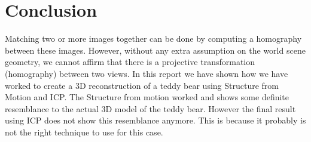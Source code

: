 \section{Conclusion}
\label{conclusion}

Matching two or more images together can be done by computing a homography between these images.
However, without any extra assumption on the world scene geometry, we cannot affirm that there is a projective transformation (homography) between two views.
In this report we have shown how we have worked to create a 3D reconstruction of a teddy bear using Structure from Motion and ICP.
The Structure from motion worked and shows some definite resemblance to the actual 3D model of the teddy bear.
However the final result using ICP does not show this resemblance anymore.
This is because it probably is not the right technique to use for this case.
